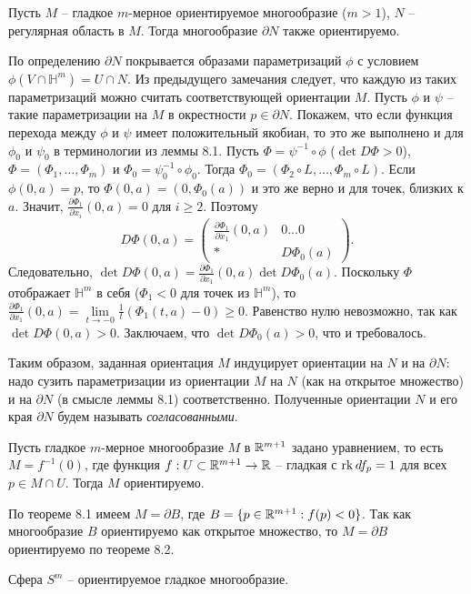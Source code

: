 \begin{theorem}
    Пусть $M$ -- гладкое $m$-мерное ориентируемое многообразие ($m > 1$), $N$ -- регулярная область в $M$. Тогда многообразие $\partial N$ также ориентируемо.
\end{theorem}

\begin{myproof}
    По определению $\partial N$ покрывается образами параметризаций $\phi$ с условием $\phi(V \cap \mathbb{H}^m) = U \cap N$. Из предыдущего замечания следует, что каждую из таких параметризаций можно считать соответствующей ориентации $M$.
	Пусть $\phi$ и $\psi$ -- такие параметризации на $M$ в окрестности $p \in \partial N$. Покажем, что если функция перехода между $\phi$ и $\psi$ имеет положительный якобиан, то это же выполнено и для $\phi_0$ и $\psi_0$ в терминологии из леммы 8.1.
    Пусть $\Phi = \psi^{-1} \circ \phi$ ($\det D \Phi > 0$), $\Phi = (\Phi_1, \dots, \Phi_m)$ и $\Phi_0 = \psi_0^{-1} \circ \phi_0$. Тогда $\Phi_0 = (\Phi_2 \circ L, \dots, \Phi_m \circ L)$. Если $\phi(0, a) = p$, то $\Phi(0, a) = (0, \Phi_0(a))$ и это же верно и для точек, близких к $a$. Значит, $\frac{\partial \Phi_1}{\partial x_i}(0, a) = 0$ для $i \geq 2$. Поэтому
    \[
    D\Phi(0, a) = \begin{pmatrix} \frac{\partial \Phi_1}{\partial x_1}(0, a) & 0 \dots 0 \\ * & D\Phi_0(a) \end{pmatrix}.
    \]
    Следовательно, $\det D\Phi(0, a) = \frac{\partial \Phi_1}{\partial x_1}(0, a) \det D\Phi_0(a)$.
	Поскольку $\Phi$ отображает $\mathbb{H}^m$ в себя ($\Phi_1 < 0$ для точек из $\mathbb{H}^m$), то $\frac{\partial \Phi_1}{\partial x_1}(0, a) = \lim \limits_{t \to -0} \frac{1}{t}(\Phi_1(t, a) - 0) \ge 0$. 
	Равенство нулю невозможно, так как $\det D\Phi(0, a) > 0$. Заключаем, что $\det D\Phi_0(a) > 0$, что и требовалось.
\end{myproof}

\begin{note}
	Таким образом, заданная ориентация $M$ индуцирует ориентации на $N$ и на $\partial N$: надо сузить параметризации из ориентации $M$ на $N$ (как на открытое множество) и на $\partial N$ (в смысле леммы 8.1) соответственно. Полученные ориентации $N$ и его края $\partial N$ будем называть \textit{согласованными}.
\end{note}

\begin{lemma}
    Пусть гладкое $m$-мерное многообразие $M$ в $\mathbb{R}^{m+1}$ задано уравнением, то есть $M = f^{-1}(0)$, где функция $f: U \subset \mathbb{R}^{m+1} \to \mathbb{R}$ -- гладкая с $\operatorname{rk} df_p = 1$ для всех $p \in M \cap U$. Тогда $M$ ориентируемо.
\end{lemma}

\begin{myproof}
    По теореме 8.1 имеем $M = \partial B$, где $B = \{p \in \mathbb{R}^{m+1}: f(p) < 0\}$. Так как многообразие $B$ ориентируемо как открытое множество, то $M = \partial B$ ориентируемо по теореме 8.2.
\end{myproof}

\begin{example}
    Сфера $S^m$ -- ориентируемое гладкое многообразие.
\end{example}
